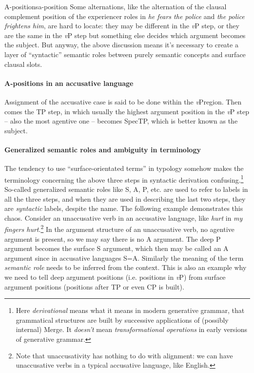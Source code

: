 \documentclass[a4paper, oneside]{report}
\newcommand*{\term}[1]{\emph{#1}}
\newcommand{\form}[1]{\emph{#1}}
\newcommand{\vP}{\textit{v}P}
\begin{document}
\begin{theorybox}{A-positions}{a-position}
    Some alternations, like the alternation of the clausal complement position of 
    the experiencer roles in  
    \form{he fears the police} and \form{the police frightens him},
    are hard to locate: 
    they may be different in the \vP{} step,
    or they are the same in the \vP{} step but something else decides 
    which argument becomes the subject.
    But anyway, the above discussion means it's necessary to create 
    a layer of ``syntactic'' semantic roles
    between purely semantic concepts and surface clausal slots.

    \paragraph*{A-positions in an accusative language} 
    Assignment of the accusative case is said to be done within the \vP region.
    Then comes the TP step, in which
    usually the highest argument position in the \vP{} step -- also the most agentive one --
    becomes SpecTP, 
    which is better known as the subject.
    
    \paragraph*{Generalized semantic roles and ambiguity in terminology} 
    The tendency to use ``surface-orientated terms'' in typology 
    somehow makes the terminology concerning the 
    above three steps in syntactic derivation confusing.\footnote{
        Here \term{derivational} means what it means in modern generative grammar, 
        that grammatical structures are built by successive applications of (possibly internal) Merge.
        It \emph{doesn't} mean \emph{transformational operations}
        in early versions of generative grammar.
    }
    So-called generalized semantic roles like S, A, P, etc.
    are used to refer to labels in all the three steps, 
    and when they are used in describing the last two steps,
    they are \emph{syntactic} labels, despite the name. 
    The following example demonstrates this chaos.
    Consider an unaccusative verb in an accusative language,
    like \form{hurt} in \form{my fingers hurt}.\footnote{
        Note that unaccusativity has nothing to do with alignment:
        we can have unaccusative verbs in a typical accusative language, like English.
    } 
    In the argument structure of an unaccusative verb,
    no agentive argument is present,
    so we may say there is no A argument. 
    The deep P argument becomes the surface S argument,
    which then may be called an A argument since in accusative languages S=A.
    Similarly the meaning of the term \term{semantic role}
    needs to be inferred from the context.
    This is also an example why we need to tell deep argument positions (i.e. positions in \vP{})
    from surface argument positions (positions after TP or even CP is built).


\end{theorybox}
\end{document}
